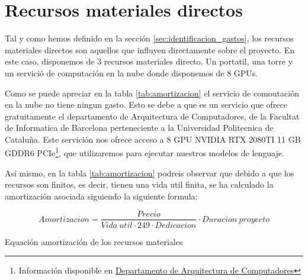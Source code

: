 \section{Recursos materiales directos}
\label{sec:recursos_directos}

Tal y como hemos definido en la sección \ref{sec:identificacion_gastos}, los recursos materiales directos son aquellos que influyen directamente sobre el
proyecto. En este caso, disponemos de 3 recursos materiales directo. Un portatil, una torre y un servició de computación en la nube donde disponemos de 8 GPUs.

Como se puede apreciar en la tabla \ref{tab:amortizacion} el servicio de comoutación en la nube no tiene ningun gasto. Esto se debe a que es un servicio que ofrece
gratuitamente el departamento de Arquitectura de Computadores, de la Facultat de Informatica de Barcelona perteneciente a la Universidad Politecnica de Cataluña.
Este servición nos ofrece acceso a 8 GPU NVIDIA RTX 2080TI 11 GB GDDR6 PCIe\footnote{Información disponible en \href{https://www.ac.upc.edu/ca/nosaltres/serveis-tic/blog/nou-node-amb-gpus-al-cluster-sert}{Departamento de Arquitectura de Computadores}},
que utilizaremos para ejecutar nuestros modelos de lenguaje.

Así mismo, en la tabla \ref{tab:amortizacion} podreis observar que debido a que los recursos son finitos, es decir, tienen una vida util finita, se ha calculado la
amortización asociada siguiendo la siguiente formula:


\begin{myequation}[h]
    \begin{equation}
        Amortizacion= \frac{Precio}{Vida\ util \cdot 249\cdot Dedicacion}\cdot Duracion\ proyecto
    \label{ec:ec1}
    \end{equation}
    \caption{Equación amortización de los recursos materiales}
\end{myequation} 

